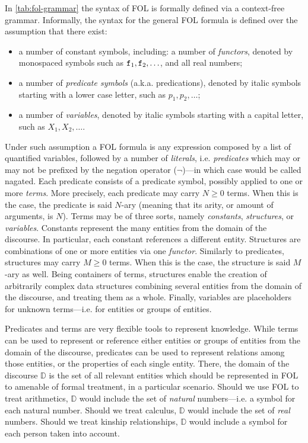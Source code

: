 \documentclass[12pt,a4paper,openright,twoside]{book}
\begin{document}
In \cref{tab:fol-grammar} the syntax of FOL is formally defined via a context-free grammar.
%
Informally, the syntax for the general FOL formula is defined over the assumption that there exist:
%
\begin{itemize}
    \item a number of constant symbols, including: a number of \emph{functors}, denoted by monospaced symbols such as $\mathtt{f}_1, \mathtt{f}_2, \ldots$, and all real numbers;
    
    \item a number of \emph{predicate symbols} (a.k.a. predications), denoted by italic symbols starting with a lower case letter, such as $p_1, p_2, \ldots$;
    
    \item a number of \emph{variables}, denoted by italic symbols starting with a capital letter, such as $X_1, X_2, \ldots$.
\end{itemize}
%
Under such assumption a FOL formula is any expression composed by a list of quantified variables, followed by a number of \emph{literals}, i.e. \emph{predicates} which may or may not be prefixed by the negation operator ($\lnot$)---in which case would be called nagated.
%
Each predicate consists of a predicate symbol, possibly applied to one or more \emph{terms}.
%
More precisely, each predicate may carry $N \geq 0$ terms.
%
When this is the case, the predicate is said $N$-ary (meaning that its arity, or amount of arguments, is $N$).
%
Terms may be of three sorts, namely \emph{constants}, \emph{structures}, or \emph{variables}.
%
Constants represent the many entities from the domain of the discourse.
%
In particular, each constant references a different entity.
%
Structures are combinations of one or more entities via one \emph{functor}.
%
Similarly to predicates, structures may carry $M \geq 0$ terms.
%
When this is the case, the structure is said $M$-ary as well.
%
Being containers of terms, structures enable the creation of arbitrarily complex data structures combining several entities from the domain of the discourse, and treating them as a whole.
%
Finally, variables are placeholders for unknown terms---i.e. for entities or groups of entities.

Predicates and terms are very flexible tools to represent knowledge.
%
While terms can be used to represent or reference either entities or groups of entities from the domain of the discourse, predicates can be used to represent relations among those entities, or the properties of each single entity.
%
There, the domain of the discourse $\mathbb{D}$
is the set of all relevant entities which should be represented in FOL to amenable of formal treatment, in a particular scenario.
%
Should we use FOL to treat arithmetics, $\mathbb{D}$ would include the set of \emph{natural} numbers---i.e. a symbol for each natural number.
%
Should we treat calculus, $\mathbb{D}$ would include the set of \emph{real} numbers.
%
Should we treat kinship relationships, $\mathbb{D}$ would include a symbol for each person taken into account.
\end{document}
